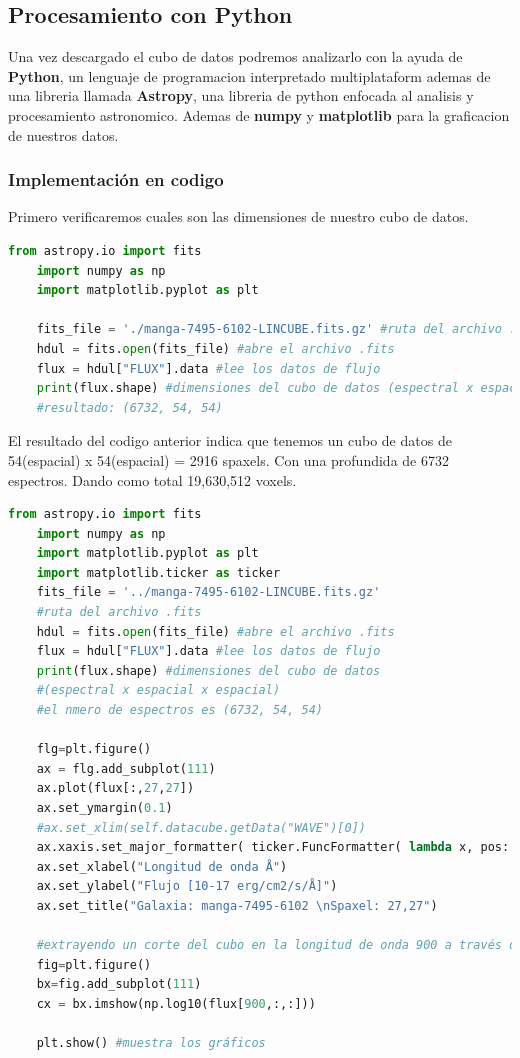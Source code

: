 \documentclass[9pt,twocolumn,a4paper]{opticajnl}
\begin{document}
\subsection*{Procesamiento con Python}
Una vez descargado el cubo de datos podremos analizarlo con la ayuda de \textbf{Python}, un lenguaje de programacion interpretado multiplataform ademas de una libreria llamada \textbf{Astropy}, una libreria de python enfocada al analisis y procesamiento astronomico. Ademas de \textbf{numpy} y \textbf{matplotlib} para la graficacion de nuestros datos.

\subsubsection*{Implementación en codigo}

Primero verificaremos cuales son las dimensiones de nuestro cubo de datos.

\begin{lstlisting}[language=Python]
    from astropy.io import fits
    import numpy as np
    import matplotlib.pyplot as plt
    
    fits_file = './manga-7495-6102-LINCUBE.fits.gz' #ruta del archivo .fits
    hdul = fits.open(fits_file) #abre el archivo .fits
    flux = hdul["FLUX"].data #lee los datos de flujo
    print(flux.shape) #dimensiones del cubo de datos (espectral x espacial x espacial)
    #resultado: (6732, 54, 54)
\end{lstlisting}

El resultado del codigo anterior indica que tenemos un cubo de datos de 54(espacial) x 54(espacial) = 2916 spaxels. Con una profundida de 6732 espectros. Dando como total 19,630,512 voxels.

\begin{lstlisting}[language=Python]
    from astropy.io import fits
    import numpy as np
    import matplotlib.pyplot as plt
    import matplotlib.ticker as ticker
    fits_file = '../manga-7495-6102-LINCUBE.fits.gz'
    #ruta del archivo .fits
    hdul = fits.open(fits_file) #abre el archivo .fits
    flux = hdul["FLUX"].data #lee los datos de flujo
    print(flux.shape) #dimensiones del cubo de datos
    #(espectral x espacial x espacial)
    #el nmero de espectros es (6732, 54, 54)
    
    flg=plt.figure()
    ax = flg.add_subplot(111)
    ax.plot(flux[:,27,27])
    ax.set_ymargin(0.1)
    #ax.set_xlim(self.datacube.getData("WAVE")[0])
    ax.xaxis.set_major_formatter( ticker.FuncFormatter( lambda x, pos: '{}{}'.format('', str(int(x)+self.datacube.getData("WAVE")[0]))))
    ax.set_xlabel("Longitud de onda Å")
    ax.set_ylabel("Flujo [10-17 erg/cm2/s/Å]")
    ax.set_title("Galaxia: manga-7495-6102 \nSpaxel: 27,27") 
    
    #extrayendo un corte del cubo en la longitud de onda 900 a través de toda la imagen y aplicando log10 - devuelve una imagen  
    fig=plt.figure()
    bx=fig.add_subplot(111) 
    cx = bx.imshow(np.log10(flux[900,:,:]))
    
    plt.show() #muestra los gráficos
\end{lstlisting}
\end{document}
